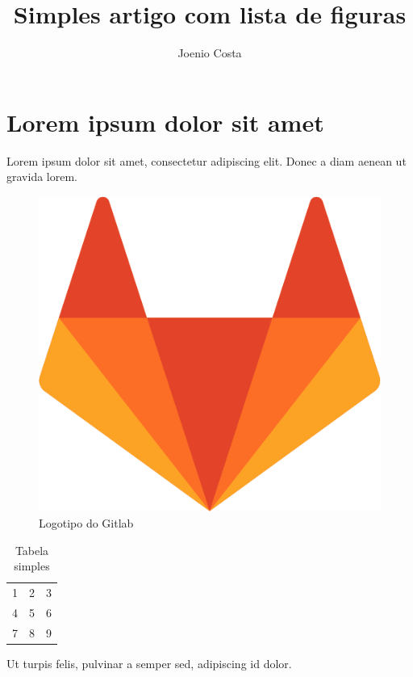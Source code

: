 \documentclass{article}
\begin{document}
\title{Simples artigo com lista de figuras}

\author{Joenio Costa}

\maketitle

\section{Lorem ipsum dolor sit amet}

Lorem ipsum dolor sit amet, consectetur adipiscing elit. Donec a diam aenean
ut gravida lorem.

\begin{figure}[h]
\center
\includegraphics[scale=0.3]{gitlab.png}
\caption{Logotipo do Gitlab}
\end{figure}

\begin{table}
  \begin{tabular}{ l c r }
    1 & 2 & 3 \\
    4 & 5 & 6 \\
    7 & 8 & 9 \\
  \end{tabular}
  \caption{Tabela simples}
\end{table}

Ut turpis felis, pulvinar a semper sed, adipiscing id dolor.
\end{document}

